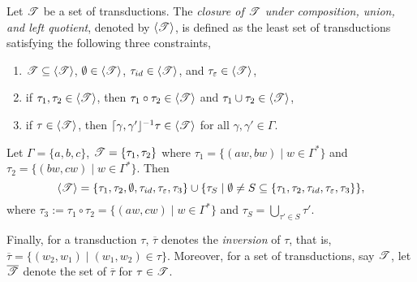 \begin{definition}
Let ${\mathscr{T} }$ be a set of transductions. The \emph{closure of ${\mathscr{T} }$ under composition, union, and left quotient}, denoted by $\langle{\mathscr{T} } \rangle $, is defined as the least set of transductions satisfying the following three constraints,
\begin{enumerate}
    \item ${\mathscr{T} } \subseteq \langle{\mathscr{T} } \rangle $, $\emptyset \in \langle{\mathscr{T} } \rangle $, $\tau_{id} \in \langle{\mathscr{T} } \rangle $, and $\tau_{\varepsilon} \in \langle{\mathscr{T} } \rangle $,
%
    \item if $\tau_1, \tau_2 \in \langle{\mathscr{T} } \rangle $, then $\tau_1 \circ \tau_2 \in \langle{\mathscr{T} } \rangle $ and $\tau_1 \cup \tau_2 \in \langle{\mathscr{T} } \rangle $,
%
    \item if $\tau \in \langle{\mathscr{T} } \rangle $, then $\lceil \gamma, \gamma' \rfloor^{-1} \tau \in \langle{\mathscr{T} } \rangle $ for all $\gamma, \gamma' \in \Gamma$.
\end{enumerate}
\end{definition}

\begin{example}
Let $\Gamma = \{a, b, c\}$, ${\mathscr{T} } = \{\tau_1, \tau_2\}$ where $\tau_1 = \{(aw, bw) \mid w \in \Gamma^*\}$ and $\tau_2 = \{(bw, cw) \mid w \in \Gamma^*\}$. Then 
$$\langle {\mathscr{T} } \rangle = \{\tau_1, \tau_2, \emptyset, \tau_{id}, \tau_\varepsilon, \tau_3\} \cup  \{\tau_S \mid \emptyset \neq S \subseteq \{\tau_1, \tau_2, \tau_{id}, \tau_\varepsilon, \tau_3\} \},$$
where $\tau_3 := \tau_1 \circ \tau_2 = \{(aw, cw) \mid w \in \Gamma^*\}$ and $\tau_S = \bigcup \limits_{\tau' \in S} \tau'$. 
\end{example}

Finally, for a transduction $\tau$, $\overline{\tau}$ denotes the \emph{inversion} of $\tau$, that is, $\overline{\tau} = \{(w_2, w_1) \mid (w_1, w_2) \in \tau\}$. Moreover, for a set of transductions, say ${\mathscr{T} }$, let $\overline{{\mathscr{T} }}$  denote the set of $\overline{\tau}$ for $\tau \in {\mathscr{T} }$.  

